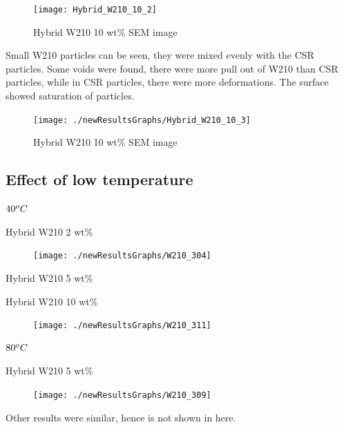 \documentclass[numbers=noendperiod,chapterprefix=on]{icldt} %
\begin{document}
{\begin{figure}[!hp]
\centering
\texttt{[image: Hybrid\_W210\_10\_2]}
\caption{Hybrid W210 10 wt\% SEM image} \label{Hybrid_W210_10_2}
\end{figure}
\FloatBarrier

Small W210 particles can be seen, they were mixed evenly with the CSR particles. Some voids were found, there were more pull out of W210 than CSR particles, while in CSR particles, there were more deformations. The surface showed saturation of particles.

\begin{figure}[!hp]
\centering
\texttt{[image: ./newResultsGraphs/Hybrid\_W210\_10\_3]}
\caption{Hybrid W210 10 wt\% SEM image} \label{Hybrid_W210_10_3}
\end{figure}
\FloatBarrier

\subsection{Effect of low temperature}

$\-40 ^oC$

Hybrid W210 2 wt\%

\begin{figure}[!hp]
 \centering
 \texttt{[image: ./newResultsGraphs/W210\_304]}
 \caption{} \label{W210_304}
 \end{figure}
 \FloatBarrier

Hybrid W210 5 wt\%

Hybrid W210 10 wt\%

\begin{figure}[!hp]
 \centering
 \texttt{[image: ./newResultsGraphs/W210\_311]}
 \caption{} \label{W210_311}
 \end{figure}
 \FloatBarrier
 
 $\-80 ^oC$
 
Hybrid W210 5 wt\%

\begin{figure}[!hp]
 \centering
 \texttt{[image: ./newResultsGraphs/W210\_309]}
 \caption{} \label{W210_309}
 \end{figure}
 \FloatBarrier 

%

Other results were similar, hence is not shown in here. 

}
\end{document}
